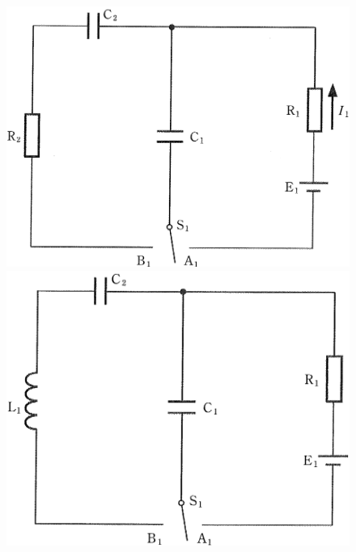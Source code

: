 \begin{figure}[H]
  \centering
  \begin{minipage}{.4\columnwidth}
    \includegraphics[width=\columnwidth]{../graphs/nagoya_23_2-1.png}
    \caption{}
  \end{minipage}
  \hspace{.1\columnwidth}
  \begin{minipage}{.4\columnwidth}
    \includegraphics[width=\columnwidth]{../graphs/nagoya_23_2-3.png}
    \caption{} 
  \end{minipage}
\end{figure}

